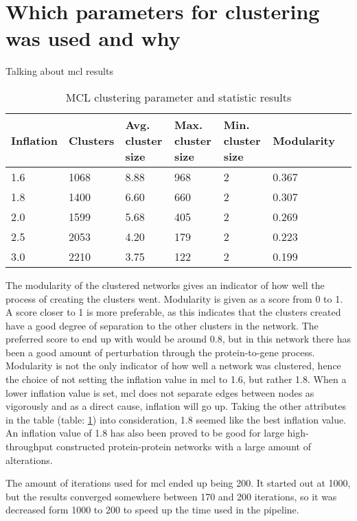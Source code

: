 \section{Which parameters for clustering was used and why}
Talking about \gls{mcl} results
\begin{table}[H]
    \centering
    \begin{tabular}{| l | p{2cm} | p{2cm} | p{2cm} | p{2cm} | p{2cm} | p{2.1cm} |}
        \hline
        \textbf{Inflation} & \textbf{Clusters} & \textbf{Avg.  cluster size} &
        \textbf{Max. cluster size} & \textbf{Min. cluster size} &
        \textbf{Modularity} \\
        \hline
        1.6 & 1068 & 8.88 & 968 & 2 & 0.367 \\
        1.8 & 1400 & 6.60 & 660 & 2 & 0.307 \\
        2.0 & 1599 & 5.68 & 405 & 2 & 0.269 \\
        2.5 & 2053 & 4.20 & 179 & 2 & 0.223 \\
        3.0 & 2210 & 3.75 & 122 & 2 & 0.199 \\
        \hline
    \end{tabular}
    \caption{MCL clustering parameter and statistic results}
    \label{tab:mcl-inflation}
\end{table}
The modularity of the clustered networks gives an indicator of how well the
process of creating the clusters went. Modularity is given as a score from 0 to
1. A score closer to 1 is more preferable, as this indicates that the clusters
created have a good degree of separation to the other clusters in the network.
The preferred score to end up with would be around 0.8, but in this network
there has been a good amount of perturbation through the protein-to-gene
process. Modularity is not the only indicator of how well a network was
clustered, hence the choice of not setting the inflation value in \gls{mcl} to
1.6, but rather 1.8. When a lower inflation value is set, \gls{mcl} does not
separate edges between nodes as vigorously and as a direct cause, inflation will
go up. Taking the other attributes in the table (table: \ref{tab:mcl-inflation}) into
consideration, 1.8 seemed like the best inflation value. An inflation value of
1.8 has also been proved to be good for large high-throughput constructed
protein-protein networks with a large amount of alterations\cite{mcl-inflation}.

The amount of iterations used for \gls{mcl} ended up being 200. It started out
at 1000, but the results converged somewhere between 170 and 200 iterations, so
it was decreased form 1000 to 200 to speed up the time used in the
\gls{pipeline}.

